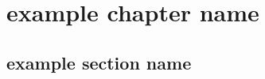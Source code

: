 
\chapter{example chapter name}\label{cap:example_chapter_name}


\section{example section name}\label{cap:example_chapter_name:example_section_name}

